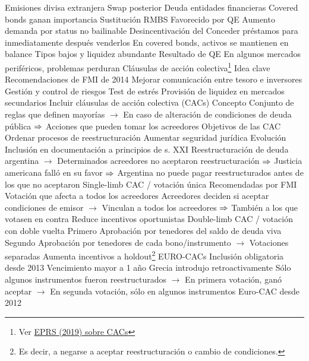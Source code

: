 \documentclass{nuevotema}
\begin{document}
\begin{esquemal}
			\3 Emisiones divisa extranjera
				\4 Swap posterior
		\2 Deuda entidades financieras
			\3 Covered bonds ganan importancia
				\4 Sustitución RMBS
				\4 Favorecido por QE
				\4 Aumento demanda por status no bailinable
				\4 Desincentivación del 
				\4[] Conceder préstamos para inmediatamente después venderlos
				\4[] En covered bonds, activos se mantienen en balance
			\3 Tipos bajos y liquidez abundante
				\4 Resultado de QE
				\4 En algunos mercados periféricos, problemas perduran
		\2 Cláusulas de acción colectiva\footnote{Ver \href{https://www.europarl.europa.eu/RegData/etudes/BRIE/2019/637974/EPRS_BRI(2019)637974_EN.pdf}{EPRS (2019) sobre CACs}}
			\3 Idea clave
				\4 Recomendaciones de FMI de 2014
				\4[] Mejorar comunicación entre tesoro e inversores
				\4[] Gestión y control de riesgos
				\4[] Test de estrés
				\4[] Provisión de liquidez en mercados secundarios
				\4[] Incluir cláusulas de acción colectiva (CACs)
				\4 Concepto
				\4[] Conjunto de reglas que definen mayorías
				\4[] $\to$ En caso de alteración de condiciones de deuda pública
				\4[] $\Rightarrow$ Acciones que pueden tomar los acreedores
				\4 Objetivos de las CAC
				\4[] Ordenar procesos de reestructuración
				\4[] Aumentar seguridad jurídica
				\4 Evolución
				\4[] Inclusión en documentación a principios de s. XXI
				\4[] Reestructuración de deuda argentina
				\4[] $\to$ Determinados acreedores no aceptaron reestructuración
				\4[] $\Rightarrow$ Justicia americana falló en su favor
				\4[] $\Rightarrow$ Argentina no puede pagar reestructurados antes de los que no aceptaron
			\3 Single-limb CAC / votación única
				\4 Recomendadas por FMI
				\4 Votación que afecta a todos los acreedores
				\4[] Acreedores deciden si aceptar condiciones de emisor
				\4[] $\to$ Vinculan a todos los acreedores
				\4[] $\Rightarrow$ También a los que votasen en contra
				\4 Reduce incentivos oportunistas
			\3 Double-limb CAC / votación con doble vuelta
				\4 Primero
				\4[] Aprobación por tenedores del saldo de deuda viva
				\4 Segundo
				\4[] Aprobación por tenedores de cada bono/instrumento
				\4[] $\to$ Votaciones separadas
				\4 Aumenta incentivos a holdout\footnote{Es decir, a negarse a aceptar reestructuración o cambio de condiciones.}
			\3 EURO-CACs
				\4 Inclusión obligatoria desde 2013
				\4 Vencimiento mayor a 1 año
				\4 Grecia introdujo retroactivamente
				\4[] Sólo algunos instrumentos fueron reestructurados
				\4[] $\to$ En primera votación, ganó aceptar
				\4[] $\to$ En segunda votación, sólo en algunos instrumentos
				\4 Euro-CAC desde 2012

\end{esquemal}
\end{document}
